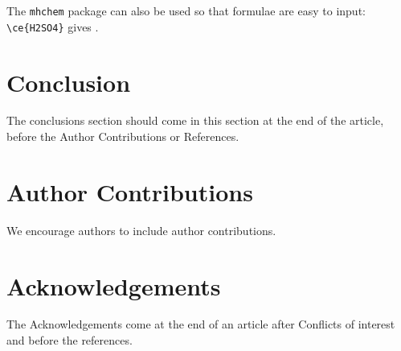 \documentclass[twoside,twocolumn,9pt]{article}
\begin{document}
{The \texttt{mhchem} package can also be used so that formulae are easy to input: \texttt{\textbackslash ce\{H2SO4\}} gives . 

\section{Conclusion}
The conclusions section should come in this section at the end of the article, before the Author Contributions or References.

\section*{Author Contributions}
We encourage authors to include author contributions. 

\section*{Acknowledgements}
The Acknowledgements come at the end of an article after Conflicts of interest and before the references.





\printbibliography %
}
\end{document}
